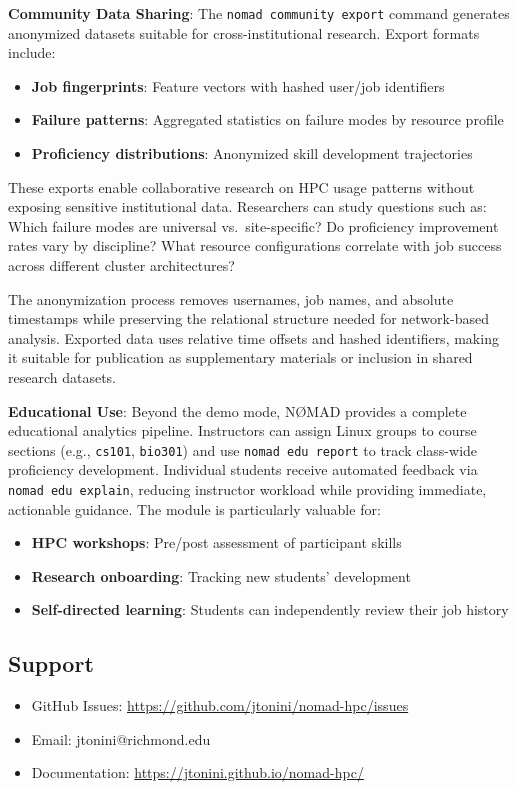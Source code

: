 \documentclass[11pt,a4paper]{article}
\begin{document}
\textbf{Community Data Sharing}: The \texttt{nomad community export} command generates anonymized datasets suitable for cross-institutional research. Export formats include:

\begin{itemize}
\item \textbf{Job fingerprints}: Feature vectors with hashed user/job identifiers
\item \textbf{Failure patterns}: Aggregated statistics on failure modes by resource profile
\item \textbf{Proficiency distributions}: Anonymized skill development trajectories
\end{itemize}

These exports enable collaborative research on HPC usage patterns without exposing sensitive institutional data. Researchers can study questions such as: Which failure modes are universal vs.\ site-specific? Do proficiency improvement rates vary by discipline? What resource configurations correlate with job success across different cluster architectures?

The anonymization process removes usernames, job names, and absolute timestamps while preserving the relational structure needed for network-based analysis. Exported data uses relative time offsets and hashed identifiers, making it suitable for publication as supplementary materials or inclusion in shared research datasets.

\textbf{Educational Use}: Beyond the demo mode, NØMAD provides a complete educational analytics pipeline. Instructors can assign Linux groups to course sections (e.g., \texttt{cs101}, \texttt{bio301}) and use \texttt{nomad edu report} to track class-wide proficiency development. Individual students receive automated feedback via \texttt{nomad edu explain}, reducing instructor workload while providing immediate, actionable guidance. The module is particularly valuable for:

\begin{itemize}
\item \textbf{HPC workshops}: Pre/post assessment of participant skills
\item \textbf{Research onboarding}: Tracking new  students' development
\item \textbf{Self-directed learning}: Students can independently review their job history
\end{itemize}

\subsection*{Support}
\begin{itemize}
\item GitHub Issues: \url{https://github.com/jtonini/nomad-hpc/issues}
\item Email: jtonini@richmond.edu
\item Documentation: \url{https://jtonini.github.io/nomad-hpc/}
\end{itemize}
\end{document}
